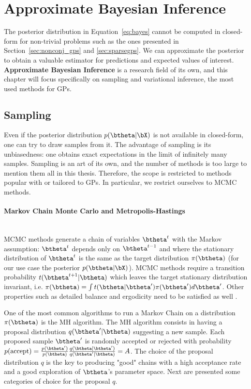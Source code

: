 \section{Approximate Bayesian Inference}
\label{sec:approx_inf}

The posterior distribution in Equation~\eqref{eq:bayes} cannot be computed in closed-form for non-trivial problems such as the ones presented in Section~\ref{sec:nonconj_gps} and \ref{sec:sparsegps}.
We can approximate the posterior to obtain a valuable estimator for predictions and expected values of interest.
\textbf{Approximate Bayesian Inference} is a research field of its own, and this chapter will focus specifically on sampling and variational inference, the most used methods for \ac{GPs}.

\subsection{Sampling}

Even if the posterior distribution $p(\btheta|\bX)$ is not available in closed-form, one can try to draw samples from it.
The advantage of sampling is its unbiasedness: one obtains exact expectations in the limit of infinitely many samples.
Sampling is an art of its own, and the number of methods is too large to mention them all in this thesis.
Therefore, the scope is restricted to methods popular with or tailored to \ac{GPs}.
In particular, we restrict ourselves to \ac{MCMC} methods.

\paragraph{Markov Chain Monte Carlo and Metropolis-Hastings}\mbox{}\\
\acf{MCMC} methods generate a chain of variables $\btheta^t$ with the Markov assumption: $\btheta^t$ depends only on $\btheta^{t-1}$ and where the stationary distribution of $\btheta^t$ is the same as the target distribution $\pi(\btheta)$ (for our use case the posterior $p(\btheta|\bX)$).
\ac{MCMC} methods require a transition probability $t(\btheta^{t+1}|\btheta)$ which leaves the target stationary distribution invariant, i.e. $\pi(\btheta) = \int t(\btheta|\btheta')\pi(\btheta')d\btheta'$.
Other properties such as detailed balance and ergodicity need to be satisfied as well \cite{brooks2011handbook, o2004kendall}.

One of the most common algorithms to run a Markov Chain on a distribution $\pi(\btheta)$ is the \acf{MH} algorithm.
The \ac{MH} algorithm consists in having a proposal distribution $q(\btheta'|\btheta)$ suggesting a new sample.
Each proposed sample $\btheta'$ is randomly accepted or rejected with probability $p(\text{accept}) = \frac{p(\btheta')}{p(\btheta)}\frac{q(\btheta|\btheta')}{q(\btheta'|\btheta)} = A$.
The choice of the proposal distribution $q$ is the key to producing "good" chains with a high acceptance rate and a good exploration of $\btheta$'s parameter space.
Next are presented some categories of choice for the proposal $q$.


